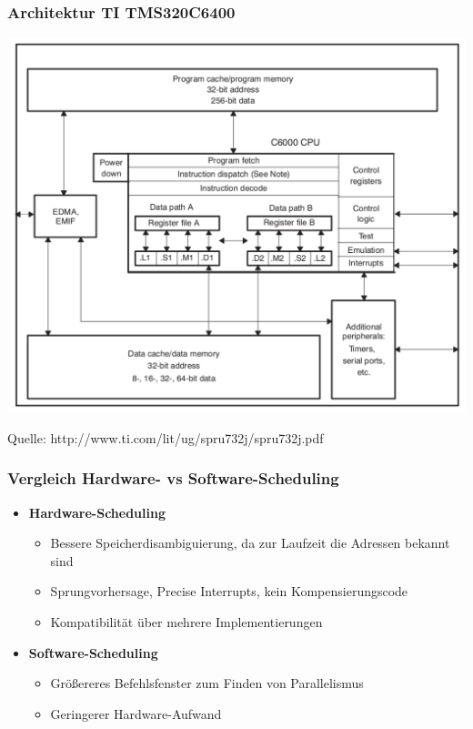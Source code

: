 \subsubsection{Architektur TI TMS320C6400}
\includegraphics[scale=0.35]{mikroprozessoren2/TI-TMS320C64x.pdf}

Quelle: http://www.ti.com/lit/ug/spru732j/spru732j.pdf

\subsubsection{Vergleich Hardware- vs Software-Scheduling}
\begin{itemize}
	\item \textbf{Hardware-Scheduling}
	\begin{itemize}
		\item Bessere Speicherdisambiguierung, da zur Laufzeit die Adressen bekannt sind %
		\item Sprungvorhersage, Precise Interrupts, kein Kompensierungscode
		\item Kompatibilität über mehrere Implementierungen
	\end{itemize}
	\item \textbf{Software-Scheduling}
	\begin{itemize}
		\item Größereres Befehlsfenster zum Finden von Parallelismus
		\item Geringerer Hardware-Aufwand
	\end{itemize}
\end{itemize}


